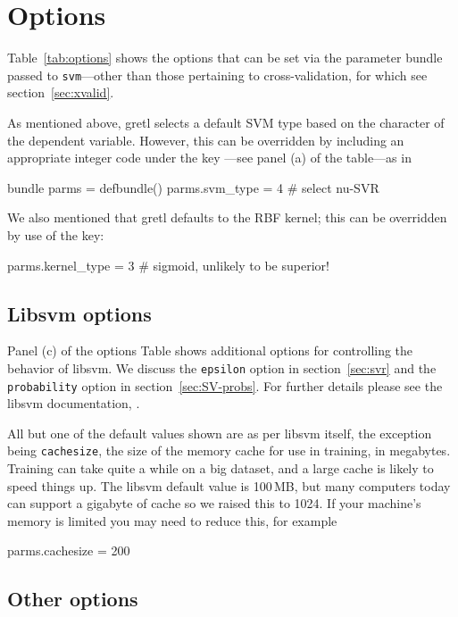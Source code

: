 \documentclass{article}
\begin{document}
\section{Options}
\label{sec:options}

Table~\ref{tab:options} shows the options that can be set via the
parameter bundle passed to \texttt{svm}---other than those pertaining
to cross-validation, for which see section~\ref{sec:xvalid}.

As mentioned above, gretl selects a default SVM type based on the
character of the dependent variable. However, this can be overridden
by including an appropriate integer code under the key
---see panel (a) of the table---as in
\begin{code}
bundle parms = defbundle()
parms.svm_type = 4 # select nu-SVR
\end{code}
We also mentioned that gretl defaults to the RBF kernel; this can be
overridden by use of the  key:
\begin{code}
parms.kernel_type = 3 # sigmoid, unlikely to be superior!
\end{code}

\subsection{Libsvm options}
\label{sec:libsvm-options}

Panel (c) of the options Table shows additional options for
controlling the behavior of \textsf{libsvm}. We discuss the
\texttt{epsilon} option in section~\ref{sec:svr} and the
\texttt{probability} option in section~\ref{sec:SV-probs}. For further
details please see the \textsf{libsvm} documentation, \cite{HCL16}.

All but one of the default values shown are as per \textsf{libsvm}
itself, the exception being \texttt{cachesize}, the size of the memory
cache for use in training, in megabytes. Training can take quite a
while on a big dataset, and a large cache is likely to speed things
up. The \textsf{libsvm} default value is 100\,MB, but many computers
today can support a gigabyte of cache so we raised this to 1024. If
your machine's memory is limited you may need to reduce this, for
example
\begin{code}
parms.cachesize = 200
\end{code}

\subsection{Other options}
\label{sec:gretl-options}
\end{document}
